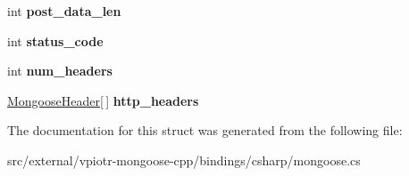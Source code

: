\begin{DoxyCompactItemize}
\item 
\hypertarget{struct_mongoose_request_info_a0dfe97d6930924aac99a81994dd8109b}{int {\bfseries post\-\_\-data\-\_\-len}}\label{struct_mongoose_request_info_a0dfe97d6930924aac99a81994dd8109b}

\item 
\hypertarget{struct_mongoose_request_info_add55c8bbb41c0d751af381d09fd297a2}{int {\bfseries status\-\_\-code}}\label{struct_mongoose_request_info_add55c8bbb41c0d751af381d09fd297a2}

\item 
\hypertarget{struct_mongoose_request_info_aa2108b0eaf182b000311e4ccb9f0d5cc}{int {\bfseries num\-\_\-headers}}\label{struct_mongoose_request_info_aa2108b0eaf182b000311e4ccb9f0d5cc}

\item 
\hypertarget{struct_mongoose_request_info_ac9f7aebab0875bf8314cbad42b56884f}{\hyperlink{struct_mongoose_header}{Mongoose\-Header}\mbox{[}$\,$\mbox{]} {\bfseries http\-\_\-headers}}\label{struct_mongoose_request_info_ac9f7aebab0875bf8314cbad42b56884f}

\end{DoxyCompactItemize}


The documentation for this struct was generated from the following file\-:\begin{DoxyCompactItemize}
\item 
src/external/vpiotr-\/mongoose-\/cpp/bindings/csharp/mongoose.\-cs\end{DoxyCompactItemize}
